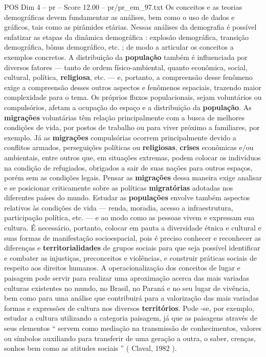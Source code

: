 \begin{textsample}{POS Dim 4 – pr – Score 12.00 – pr/pr\_em\_97.txt}
Os conceitos e as teorias demográficas devem fundamentar as análises, bem como o uso de dados e gráficos, tais como as pirâmides etárias.
Nessas análises da demografia é possível enfatizar as etapas da dinâmica demográfica : explosão demográfica, transição demográfica, bônus demográfico, etc. ; de modo a articular os conceitos a exemplos concretos.
A distribuição da \textbf{população} também é influenciada por diversos fatores — tanto de ordem físico-ambiental, quanto econômica, social, cultural, política, \textbf{religiosa}, etc. — e, portanto, a compreensão desse fenômeno exige a compreensão desses outros aspectos e fenômenos espaciais, trazendo maior complexidade para o tema.
Os próprios fluxos populacionais, sejam voluntários ou compulsórios, afetam a ocupação do espaço e a distribuição da \textbf{população}.
As \textbf{migrações} voluntárias têm relação principalmente com a busca de melhores condições de vida, por postos de trabalho ou para viver próximo a familiares, por exemplo.
Já as \textbf{migrações} compulsórias ocorrem principalmente devido a conflitos armados, perseguições políticas ou \textbf{religiosas}, \textbf{crises} econômicas e/ou ambientais, entre outros que, em situações extremas, podem colocar os indivíduos na condição de refugiados, obrigados a sair de suas nações para outros espaços, porém sem as condições legais.
Pensar as \textbf{migrações} dessa maneira exige analisar e se posicionar criticamente sobre as políticas \textbf{migratórias} adotadas nos diferentes países do mundo.
Estudar as \textbf{populações} envolve também aspectos relativos às condições de vida — renda, moradia, acesso a infraestrutura, participação política, etc. — e ao modo como as pessoas vivem e expressam sua cultura.
É necessário, portanto, colocar em pauta a diversidade étnica e cultural e suas formas de manifestação socioespacial, pois é preciso conhecer e reconhecer as diferenças e \textbf{territorialidades} de grupos sociais para que seja possível identificar e combater as injustiças, preconceitos e violências, e construir práticas sociais de respeito aos direitos humanos.
A operacionalização dos conceitos de lugar e paisagem pode servir para realizar uma aproximação acerca das mais variadas culturas existentes no mundo, no Brasil, no Paraná e no seu lugar de vivência, bem como para uma análise que contribuirá para a valorização das mais variadas formas e expressões de cultura nos diversos \textbf{territórios}.
Pode -se, por exemplo, estudar a cultura utilizando a categoria paisagem, já que as paisagens através de seus elementos “ servem como mediação na transmissão de conhecimentos, valores ou símbolos auxiliando para transferir de uma geração a outra, o saber, crenças, sonhos bem como as atitudes sociais ” ( Claval, 1982 ).

\end{textsample}
